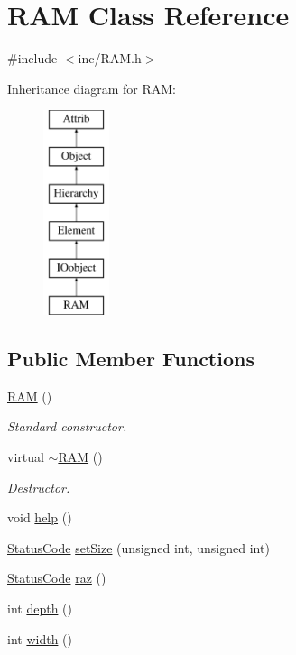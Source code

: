 \hypertarget{classRAM}{}\section{R\+AM Class Reference}
\label{classRAM}


{\ttfamily \#include $<$inc/\+R\+A\+M.\+h$>$}

Inheritance diagram for R\+AM\+:\begin{figure}[H]
\begin{center}
\leavevmode
\includegraphics[height=6.000000cm]{classRAM}
\end{center}
\end{figure}
\subsection*{Public Member Functions}
\begin{DoxyCompactItemize}
\item 
\hyperlink{classRAM_a25289e9f70eb7de231f869a6032f179b}{R\+AM} ()
\begin{DoxyCompactList}\small\item\em Standard constructor. \end{DoxyCompactList}\item 
virtual \hyperlink{classRAM_ac884b3e9ee3c3d95ebcd7b6ed9851da3}{$\sim$\+R\+AM} ()
\begin{DoxyCompactList}\small\item\em Destructor. \end{DoxyCompactList}\item 
void \hyperlink{classRAM_ac1e78007fabee045f00f342a907fa25c}{help} ()
\item 
\hyperlink{classStatusCode}{Status\+Code} \hyperlink{classRAM_adcf2ebb12f1a3e833ce7d5a33670c29d}{set\+Size} (unsigned int, unsigned int)
\item 
\hyperlink{classStatusCode}{Status\+Code} \hyperlink{classRAM_aac835f84bf892cd4d95b5d7a0caa62f0}{raz} ()
\item 
int \hyperlink{classRAM_aa36cbedb8a970a01ee07a9637553887f}{depth} ()
\item 
int \hyperlink{classRAM_a7770fe5392ee3f962acb14724849e01c}{width} ()
\end{DoxyCompactItemize}

